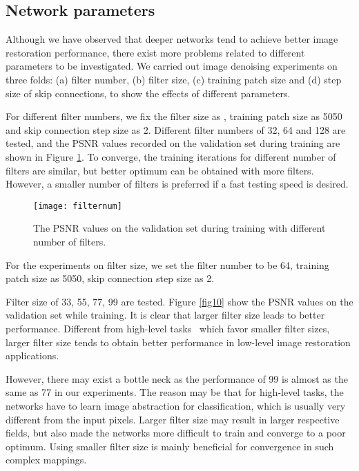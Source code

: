 \documentclass[10pt,journal,compsoc]{IEEEtran}
\begin{document}
\subsection{Network parameters}

Although we have observed that deeper networks tend to achieve better image restoration
performance, there exist more problems related to different parameters to be investigated.
We carried out image denoising experiments on three folds: (a) filter number,
(b) filter size, (c) training patch size and (d) step size of skip connections, to
show the effects of different parameters.

For different filter numbers, we fix the filter size as , training patch size
as 5050 and skip connection step size as 2. Different filter numbers of 32, 64
and 128 are tested, and the PSNR values recorded on the validation set during training
are shown in Figure \ref{fig9}. To converge, the training iterations for different number
of filters are similar, but better optimum can be obtained with more filters. However,
a smaller number of filters is preferred if a fast testing speed is desired.

\begin{figure}[t!]
\centering
\texttt{[image: filternum]}
\caption{The PSNR values on the validation set during training with different number of filters.}
\label{fig9}
\end{figure}

For the experiments on filter size, we set the filter number to be 64, training patch
size as 5050, skip connection step size as 2.

Filter size of 33,
55, 77, 99 are tested. Figure \ref{fig10} show the PSNR values
on the validation set while training. It is clear that larger filter size leads to
better performance. Different from high-level tasks~\cite{DBLP:conf/eccv/ZeilerF14,
DBLP:journals/corr/SermanetEZMFL13,DBLP:journals/corr/SimonyanZ14a} which favor smaller
filter sizes, larger filter size tends to obtain better performance in low-level image
restoration applications.

However, there  may  exist a bottle neck  as  the performance
of 99 is almost as the same as 77 in our experiments. The reason may be
that for high-level tasks, the networks have to learn image abstraction for classification, which is usually
very different from the input pixels. Larger filter size may result in larger respective fields,
but also made the networks more difficult to train and converge to a poor optimum. Using
smaller filter size is mainly beneficial for convergence in such complex mappings.
\end{document}
